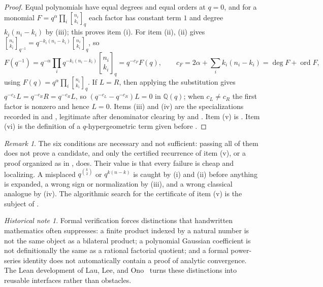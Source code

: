 \documentclass[11pt,oneside,openany]{book}
\theoremstyle{definition}
\theoremstyle{remark}
\newtheorem{remark}[remark]{Remark}
\newtheorem{historicalnote}[historicalnote]{Historical note}
\newcommand{\qbinom}[2]{\genfrac{[}{]}{0pt}{}{#1}{#2}_{q}}
\newcommand{\Qbinom}[3]{\genfrac{[}{]}{0pt}{}{#1}{#2}_{#3}}
\newcommand{\Q}{\mathbb Q}
\newcommand{\ord}{\operatorname{ord}}
\begin{document}
\begin{proof}
Equal polynomials have equal degrees and equal orders at $q=0$, and for a
monomial $F=q^{\alpha}\prod_i\qbinom{n_i}{k_i}$ each factor has constant term
$1$ and degree $k_i(n_i-k_i)$ by (iii); this proves
item (i).  For item (ii), (ii) gives
$\Qbinom{n_i}{k_i}{q^{-1}}=q^{-k_i(n_i-k_i)}\qbinom{n_i}{k_i}$, so
\[
 F(q^{-1})=q^{-\alpha}\prod_i q^{-k_i(n_i-k_i)}\qbinom{n_i}{k_i}
 =q^{-c_F}F(q),
 \qquad
 c_F=2\alpha+\sum_ik_i(n_i-k_i)=\deg F+\ord F,
\]
using $F(q)=q^{\alpha}\prod_i\qbinom{n_i}{k_i}$.  If $L=R$, then applying the
substitution gives $q^{-c_L}L=q^{-c_R}R=q^{-c_R}L$, so
$(q^{-c_L}-q^{-c_R})L=0$ in $\Q(q)$; when $c_L\ne c_R$ the first factor is
nonzero and hence $L=0$.  Items (iii) and (iv) are the specializations
recorded in  and
, legitimate after denominator clearing by
 and .
Item (v) is .  Item (vi) is the definition of
a $q$-hypergeometric term given before .
\end{proof}

\begin{remark}\label{rem:tests-not-sufficient}
The six conditions are necessary and not sufficient: passing all of them does
not prove a candidate, and only the certified recurrence of item (v), or a
proof organized as in , does.  Their value is
that every failure is cheap and localizing.  A misplaced $q^{\binom k2}$ or
$q^{k(n-k)}$ is caught by (i) and (ii) before anything is expanded, a wrong
sign or normalization by (iii), and a wrong classical analogue by (iv).  The
algorithmic search for the certificate of item (v) is the subject of
\cite{PetkovsekWilfZeilberger1996}.
\end{remark}

\begin{historicalnote}
Formal verification forces distinctions that handwritten mathematics often suppresses: a finite product indexed by a natural number is not the same object as a bilateral product; a polynomial Gaussian coefficient is not definitionally the same as a rational factorial quotient; and a formal power-series identity does not automatically contain a proof of analytic convergence.  The Lean development of Lau, Lee, and Ono~\cite{LauLeeOno2026} turns these distinctions into reusable interfaces rather than obstacles.
\end{historicalnote}
\end{document}
